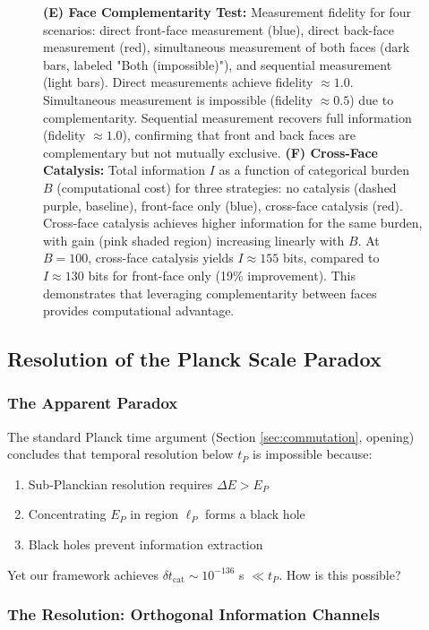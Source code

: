 \documentclass[twocolumn,10pt]{article}
\theoremstyle{remark}
\begin{document}
\begin{figure}[!htbp]
{\textbf{(E) Face Complementarity Test:} Measurement fidelity for four scenarios: direct front-face measurement (blue), direct back-face measurement (red), simultaneous measurement of both faces (dark bars, labeled "Both (impossible)"), and sequential measurement (light bars). Direct measurements achieve fidelity $\approx 1.0$. Simultaneous measurement is impossible (fidelity $\approx 0.5$) due to complementarity. Sequential measurement recovers full information (fidelity $\approx 1.0$), confirming that front and back faces are complementary but not mutually exclusive.
\textbf{(F) Cross-Face Catalysis:} Total information $I$ as a function of categorical burden $B$ (computational cost) for three strategies: no catalysis (dashed purple, baseline), front-face only (blue), cross-face catalysis (red). Cross-face catalysis achieves higher information for the same burden, with gain (pink shaded region) increasing linearly with $B$. At $B=100$, cross-face catalysis yields $I \approx 155$ bits, compared to $I \approx 130$ bits for front-face only (19\% improvement). This demonstrates that leveraging complementarity between faces provides computational advantage.}
\label{fig:molecular_observers}
\end{figure}


\subsection{Resolution of the Planck Scale Paradox}

\subsubsection{The Apparent Paradox}

The standard Planck time argument (Section \ref{sec:commutation}, opening) concludes that temporal resolution below $t_P$ is impossible because:
\begin{enumerate}
    \item Sub-Planckian resolution requires $\Delta E > E_P$
    \item Concentrating $E_P$ in region $\ell_P$ forms a black hole
    \item Black holes prevent information extraction
\end{enumerate}

Yet our framework achieves $\delta t_{\text{cat}} \sim 10^{-136}$ s $\ll t_P$. How is this possible?

\subsubsection{The Resolution: Orthogonal Information Channels}
\end{document}
